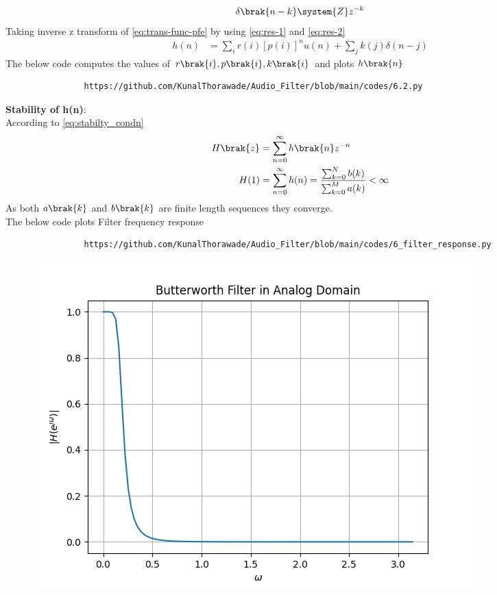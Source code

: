 \documentclass[journal,12pt,twocolumn]{IEEEtran}
\theoremstyle{remark}
\begin{document}
\begin{enumerate}[label=\thesection.\arabic*]
\begin{align}
					        \delta\brak{n-k} \system{Z} z^{-k}\label{eq:res-2}
				\end{align}
				Taking inverse z transform of \eqref{eq:trans-func-pfe} by using \eqref{eq:res-1} and \eqref{eq:res-2}
				\begin{align}
					h(n) &= \sum_{i}r(i)[p(i)]^nu(n) + \sum_{j}k(j)\delta(n - j)
						\label{eq:h-n-expr}
				\end{align}
				The below code computes the values of $r\brak{i},p\brak{i} , k\brak{i}$ and plots $h\brak{n}$
				\begin{lstlisting}
				https://github.com/KunalThorawade/Audio_Filter/blob/main/codes/6.2.py
				\end{lstlisting}

				\textbf{Stability of h(n)}:\\
				According to \eqref{eq:stabilty_condn}
				\begin{align}
					H\brak{z} &= \sum_{n = 0}^{\infty} h\brak{n}z^{-n}\\
					H(1)&= \sum_{n = 0}^{\infty}h(n)  = \frac{\sum_{k = 0}^{N}b(k)}{\sum_{k = 0}^{M}a(k)}< \infty
				\end{align}
				As both $a\brak{k}$ and $b\brak{k}$ are finite length sequences they converge.\\
				The below code plots Filter frequency response
				\begin{lstlisting}
				https://github.com/KunalThorawade/Audio_Filter/blob/main/codes/6_filter_response.py
				\end{lstlisting}
				\begin{figure}[H]
					\centering
					\includegraphics[width=1\columnwidth]{figs/Filter_Response.png}

\end{figure}
\end{enumerate}
\end{document}
